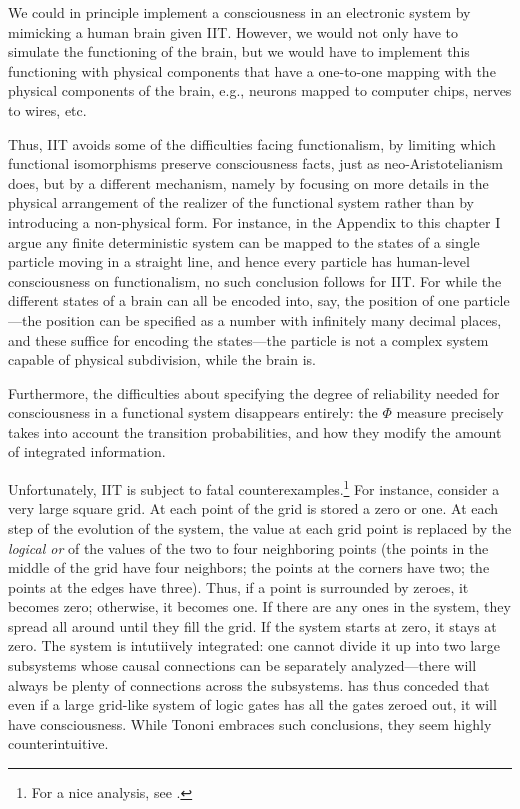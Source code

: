 We could in principle implement a consciousness in an electronic system by mimicking a human brain given IIT. However, we would 
not only have to simulate the functioning of the brain, but we would have to implement this functioning with  
physical components that have a one-to-one mapping with the physical components of the brain, e.g., neurons mapped to 
computer chips, nerves to wires, etc.

Thus, IIT avoids some of the difficulties facing functionalism, by limiting which functional isomorphisms 
preserve consciousness facts, just as neo-Aristotelianism does, but by a different mechanism, namely by focusing on
more details in the physical arrangement of the realizer of the functional system rather than by introducing a 
non-physical form. For instance, in the Appendix to this
chapter I argue any 
finite deterministic system can be mapped to the states of a single particle moving in a straight line, and 
hence every particle has human-level consciousness on functionalism, no such conclusion 
follows for IIT. For while the different states of a brain can all be encoded into, say, the position of one
particle---the position can be specified as a number with infinitely many decimal places, and these suffice
for encoding the states---the particle is not a complex system capable of physical subdivision, while the brain is. 

Furthermore, the difficulties about specifying the degree of reliability needed for consciousness in a functional
system disappears entirely: the $\Phi$ measure precisely takes into account the transition probabilities, and how
they modify the amount of integrated information.

Unfortunately, IIT is subject to fatal counterexamples.\footnote{For a nice analysis,
see .} For instance, consider a very large square grid.
At each point of the grid is stored a zero or one. At each step of the evolution of the system, the value at 
each grid point is replaced by the \textit{logical or} of the values of the two to four neighboring points (the 
points in the middle of the grid have four neighbors; the points at the corners have two; the points at the 
edges have three). Thus, if a point is surrounded by zeroes, it becomes zero; otherwise, it becomes one. If 
there are any ones in the system, they spread all around until they fill the grid. If the system starts at zero, 
it stays at zero. The system is intutiively integrated: one cannot divide it up into two large subsystems whose 
causal connections can be separately analyzed---there will always be plenty of connections across the subsystems.
 has thus conceded that even if a large grid-like system of logic gates has all the gates
zeroed out, it will have consciousness. While Tononi embraces such 
conclusions, they seem highly counterintuitive.

